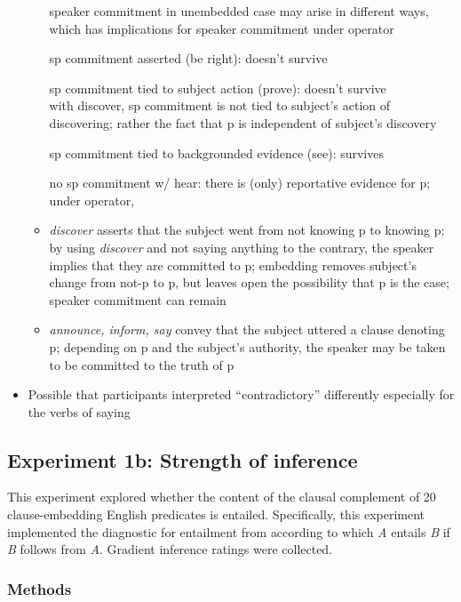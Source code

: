 \documentclass[11pt,fleqn]{article}
\newcommand{\6}{\mbox{$[\hspace*{-.6mm}[$}}
\newcommand{\9}{\mbox{$]\hspace*{-.6mm}]$}}
\begin{document}
\begin{itemize}
\begin{itemize}
speaker commitment in unembedded case may arise in different ways, which has implications for speaker commitment under operator

sp commitment asserted (be right): doesn't survive

sp commitment tied to subject action (prove): doesn't survive
\\ with discover, sp commitment is not tied to subject's action of discovering; rather the fact that p is independent of subject's discovery

sp commitment tied to backgrounded evidence (see): survives

no sp commitment w/ hear: there is (only) reportative evidence for p; under operator, 

\item {\em discover} asserts that the subject went from not knowing p to knowing p; by using {\em discover} and not saying anything to the contrary, the speaker implies that they are committed to p; embedding removes subject's change from not-p to p, but leaves open the possibility that p is the case; speaker commitment can remain

\item {\em announce, inform, say} convey that the subject uttered a clause denoting p; depending on p and the subject's authority, the speaker may be taken to be committed to the truth of p

\end{itemize}

\item Possible that participants interpreted ``contradictory'' differently especially for the verbs of saying

\end{itemize}

\subsection{Experiment 1b: Strength of inference}

This experiment explored whether the content of the clausal complement of 20 clause-embedding English predicates is entailed. Specifically, this experiment implemented the diagnostic for entailment from \citealt{ccmg90} according to which {\em A} entails {\em B} if {\em B} follows from {\em A}. Gradient inference ratings were collected.

\subsubsection{Methods}\label{s-methods2}
\end{document}
